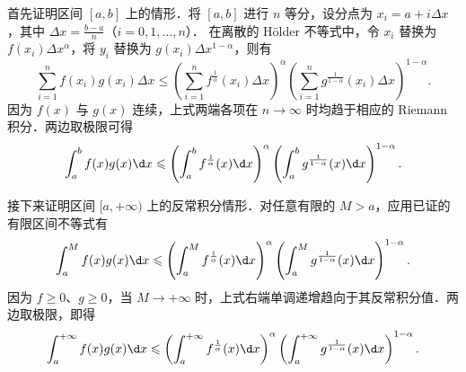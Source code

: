 \begin{myproof}

    首先证明区间 $[a, b]$ 上的情形．将 $[a, b]$ 进行 $n$ 等分，设分点为 $x_i = a + i \Delta x$，其中 $\Delta x = \frac{b-a}{n}$（$i = 0, 1, \dots, n$）．
    在离散的 Hölder 不等式中，令 $x_i$ 替换为 $f(x_i) \Delta x^{\alpha}$，将 $y_i$ 替换为 $g(x_i) \Delta x^{1-\alpha}$，则有
    \begin{equation}\label{eq:sol3-riemann}
        \sum_{i=1}^n f(x_i) g(x_i) \Delta x \leqslant \left( \sum_{i=1}^n f^{\frac{1}{\alpha}}(x_i) \Delta x \right)^{\alpha} \left( \sum_{i=1}^n g^{\frac{1}{1-\alpha}}(x_i) \Delta x \right)^{1-\alpha}.
    \end{equation}
    因为 $f(x)$ 与 $g(x)$ 连续，上式两端各项在 $n \to \infty$ 时均趋于相应的 Riemann 积分．两边取极限可得
    \begin{equation}\label{eq:sol3-lim}
        \int_a^b f(x)g(x) \d x \leqslant \left( \int_a^b f^{\frac{1}{\alpha}}(x) \d x \right)^{\alpha} \left( \int_a^b g^{\frac{1}{1-\alpha}}(x) \d x \right)^{1-\alpha}.
    \end{equation}

    接下来证明区间 $[a, +\infty)$ 上的反常积分情形．对任意有限的 $M > a$，应用已证的有限区间不等式有
    \begin{equation}\label{eq:sol3-improper-finite}
        \int_a^M f(x)g(x) \d x \leqslant \left( \int_a^M f^{\frac{1}{\alpha}}(x) \d x \right)^{\alpha} \left( \int_a^M g^{\frac{1}{1-\alpha}}(x) \d x \right)^{1-\alpha}.
    \end{equation}
    因为 $f \geqslant 0$、$g \geqslant 0$，当 $M \to +\infty$ 时，上式右端单调递增趋向于其反常积分值．两边取极限，即得
    \begin{equation}\label{eq:sol3-improper-lim}
        \int_a^{+\infty} f(x)g(x) \d x \leqslant \left( \int_a^{+\infty} f^{\frac{1}{\alpha}}(x) \d x \right)^{\alpha} \left( \int_a^{+\infty} g^{\frac{1}{1-\alpha}}(x) \d x \right)^{1-\alpha}.
    \end{equation}



\end{myproof}
